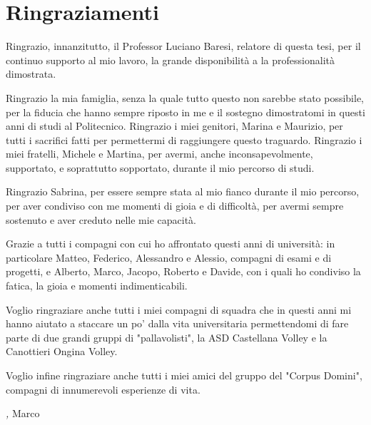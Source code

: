 %
%
\cleardoublepage
%
%
%
\chapter*{Ringraziamenti}
%
\par Ringrazio, innanzitutto, il Professor Luciano Baresi, relatore di questa tesi, per il continuo supporto al mio lavoro, la grande disponibilità a la professionalità dimostrata.\\
\par Ringrazio la mia famiglia, senza la quale tutto questo non sarebbe stato possibile, per la fiducia che hanno sempre riposto in me e il sostegno dimostratomi in questi anni di studi al Politecnico. Ringrazio i miei genitori, Marina e Maurizio, per tutti i sacrifici fatti per permettermi di raggiungere questo traguardo. Ringrazio i miei fratelli, Michele e Martina, per avermi, anche inconsapevolmente, supportato, e soprattutto sopportato, durante il mio percorso di studi.\\
\par Ringrazio Sabrina, per essere sempre stata al mio fianco durante il mio percorso, per aver condiviso con me momenti di gioia e di difficoltà, per avermi sempre sostenuto e aver creduto nelle mie capacità.\\
\par Grazie a tutti i compagni con cui ho affrontato questi anni di università: in particolare Matteo, Federico, Alessandro e Alessio, compagni di esami e di progetti, e Alberto, Marco, Jacopo, Roberto e Davide, con i quali ho condiviso la fatica, la gioia e momenti indimenticabili.\\
\par Voglio ringraziare anche tutti i miei compagni di squadra che in questi anni mi hanno aiutato a staccare un po' dalla vita universitaria permettendomi di fare parte di due grandi gruppi di "pallavolisti", la ASD Castellana Volley e la Canottieri Ongina Volley.\\
\par Voglio infine ringraziare anche tutti i miei amici del gruppo del "Corpus Domini", compagni di innumerevoli esperienze di vita.


\bigskip
\bigskip
\bigskip
\bigskip
\bigskip
\bigskip
\bigskip
\bigskip
\bigskip
\bigskip
 
\noindent\textit{\myLocation, \myTime}
\hfill Marco
%
